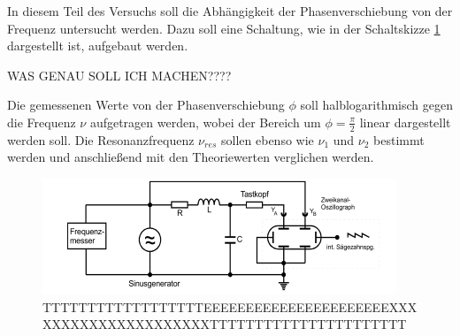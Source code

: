 In diesem Teil des Versuchs soll die Abhängigkeit der Phasenverschiebung von der Frequenz untersucht werden.
Dazu soll eine Schaltung, wie in der Schaltskizze \ref{fig:gsk5} dargestellt ist, aufgebaut werden.



WAS GENAU SOLL ICH MACHEN????

Die gemessenen Werte von der Phasenverschiebung $\phi$ soll halblogarithmisch gegen die Frequenz $\nu$
aufgetragen werden, wobei der Bereich um $\phi = \frac{\pi}{2}$ linear dargestellt werden soll.
Die Resonanzfrequenz $\nu_{res}$ sollen ebenso wie $\nu_1$ und $\nu_2$ bestimmt werden und anschließend
mit den Theoriewerten verglichen werden. 

\begin{figure}[H]
  \centering
  \includegraphics{content/aufgabeD.png}
  \caption{TTTTTTTTTTTTTTTTTTEEEEEEEEEEEEEEEEEEEEEEXXXXXXXXXXXXXXXXXXXXXTTTTTTTTTTTTTTTTTTTTTT}
  \label{fig:gsk5}
\end{figure}
